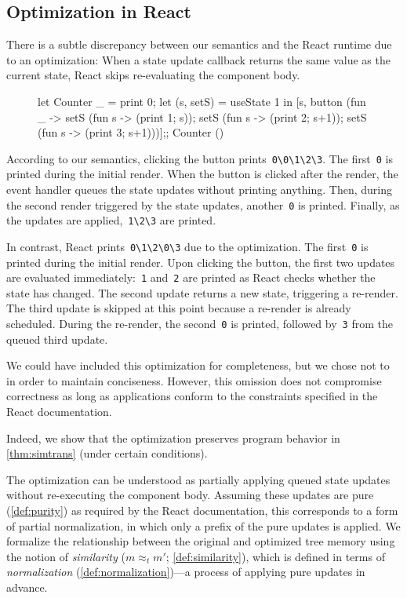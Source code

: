 \subsection{Optimization in React}\label{subsec:opt}
There is a subtle discrepancy between our semantics and the React runtime due to an optimization:
When a state update callback returns the same value as the current state, React skips re-evaluating the component body.

\begin{figure}
  \vspace*{-1.4\intextsep}
  \begin{reactcode}
let Counter _ =
  print 0;
  let (s, setS) = useState 1 in
  [s, button (fun _ ->
   setS (fun s -> (print 1; s));
   setS (fun s -> (print 2; s+1));
   setS (fun s -> (print 3; s+1)))];;
Counter ()
  \end{reactcode}
\end{figure}
\noindent According to our semantics, clicking the button prints~\verb|0\0\1\2\3|.
The first~\verb+0+ is printed during the initial render.
When the button is clicked after the render, the event handler queues the state updates without printing anything.
Then, during the second render triggered by the state updates, another~\verb+0+ is printed.
Finally, as the updates are applied,~\verb+1\2\3+ are printed.

In contrast, React prints~\verb+0\1\2\0\3+ due to the optimization.
The first~\verb+0+ is printed during the initial render.
Upon clicking the button, the first two updates are evaluated immediately:~\verb+1+ and~\verb+2+ are printed as React checks whether the state has changed.
The second update returns a new state, triggering a re-render.
The third update is skipped at this point because a re-render is already scheduled.
During the re-render, the second~\verb+0+ is printed, followed by~\verb+3+ from the queued third update.

We could have included this optimization for completeness, but we chose not to in order to maintain conciseness.
However, this omission does not compromise correctness as long as applications conform to the constraints specified in the React documentation.

Indeed, we show that the optimization preserves program behavior in \cref{thm:simtrans} (under certain conditions).

The optimization can be understood as partially applying queued state updates without re-executing the component body.
Assuming these updates are pure (\cref{def:purity}) as required by the React documentation, this corresponds to a form of partial normalization,
in which only a prefix of the pure updates is applied.
We formalize the relationship between the original and optimized tree memory using the notion of \emph{similarity} ($m \approx_t m'$; \cref{def:similarity}),
which is defined in terms of \emph{normalization} (\cref{def:normalization})---a process of applying pure updates in advance.

